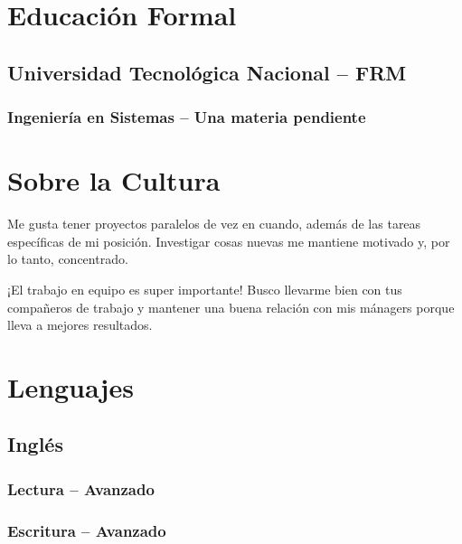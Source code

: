 \documentclass{article}
\begin{document}
\section{Educación Formal}
\subsection{Universidad Tecnológica Nacional – FRM}
\subsubsection{Ingeniería en Sistemas – Una materia pendiente}
\section{Sobre la Cultura}
  \begin{description}
    \item Me gusta tener proyectos paralelos de vez en cuando, además de las tareas específicas de mi posición. Investigar cosas nuevas me mantiene motivado y, por lo tanto, concentrado.
    \item ¡El trabajo en equipo es super importante! Busco llevarme bien con tus compañeros de trabajo y mantener una buena relación con mis mánagers porque lleva a mejores resultados.
  \end{description}
\section{Lenguajes}
\subsection{Inglés}
\subsubsection{Lectura – Avanzado}
\subsubsection{Escritura – Avanzado}
\end{document}
